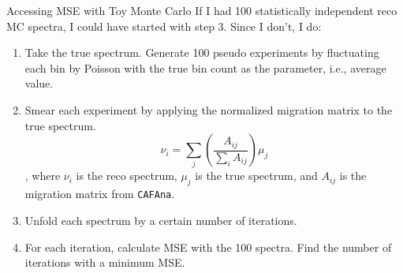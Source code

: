 \documentclass[aspectratio=169]{beamer}
\begin{document}
\begin{frame}{Accessing MSE with Toy Monte Carlo}  
  If I had 100 statistically independent reco MC spectra, I could have started with step 3. Since I don't, I do:
  \begin{enumerate}
    \small
    \item Take the true spectrum. Generate 100 pseudo experiments by fluctuating each bin by Poisson with the true bin count as the parameter, i.e., average value.
    \item Smear each experiment by applying the normalized migration matrix to the true spectrum.
      \begin{equation}
        \nu_i=\sum_j\left(\frac{A_{ij}}{\sum_i A_{ij}}\right)\mu_j
      \end{equation}
      , where $\nu_i$ is the reco spectrum, $\mu_j$ is the true spectrum, and $A_{ij}$ is the migration matrix from \texttt{CAFAna}.
    \item Unfold each spectrum by a certain number of iterations.
    \item For each iteration, calculate MSE with the 100 spectra. Find the number of iterations with a minimum MSE.
  \end{enumerate}
\end{frame}
\end{document}
